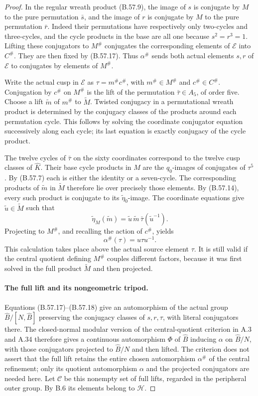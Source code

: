 \begin{proof}
In the regular wreath product (B.57.9), the image of
$s$ is conjugate by $M$ to the pure permutation
$\bar s$, and the image of $r$ is conjugate by $M$
to the pure permutation $\bar r$. Indeed their
permutations have respectively only two-cycles and
three-cycles, and the cycle products in the base
are all one because $s^2=r^3=1$. Lifting these
conjugators to $M^\#$ conjugates the corresponding
elements of $\mathscr E$ into $C^\#$. They are
then fixed by (B.57.17). Thus $\alpha^\#$ sends
both actual elements $s,r$ of $\mathscr E$ to
conjugates by elements of $M^\#$.

Write the actual cusp in $\mathscr E$ as
$\tau=m^\#c^\#$, with $m^\#\in M^\#$ and
$c^\#\in C^\#$. Conjugation by $c^\#$ on $M^\#$
is the lift of the permutation $\bar\tau\in A_5$,
of order five. Choose a lift $\widetilde m$ of
$m^\#$ to $\widetilde M$. Twisted conjugacy in a
permutational wreath product is determined by the
conjugacy classes of the products around each
permutation cycle. This follows by solving the
coordinate conjugator equation successively along
each cycle; its last equation is exactly conjugacy
of the cycle product.

The twelve cycles of $\bar\tau$ on the sixty
coordinates correspond to the twelve cusp classes
of $\widehat K$. Their base cycle products in $M$
are the $q_0$-images of conjugates of $\tau^5$.
By (B.57.7) each is either the identity or a
seven-cycle. The corresponding products of
$\widetilde m$ in $\widetilde M$ therefore lie over
precisely those elements. By (B.57.14), every such
product is conjugate to its $\widetilde\eta_0$-image.
The coordinate equations give
$\widetilde u\in\widetilde M$ such that
\[
 \widetilde\eta_M(\widetilde m)
       =\widetilde u\,\widetilde m\,
                              \bar\tau(\widetilde u^{-1}).
\]
Projecting to $M^\#$, and recalling the action of
$c^\#$, yields
\[
                         \alpha^\#(\tau)=u\tau u^{-1}.
                                                               \tag{B.57.18}
\]
This calculation takes place above the actual source
element $\tau$. It is still valid if the central
quotient defining $M^\#$ couples different factors,
because it was first solved in the full product
$\widetilde M$ and then projected.

\paragraph{The full lift and its nongeometric tripod.}
Equations (B.57.17)--(B.57.18) give an automorphism
of the actual group $\widehat B/[N,\widehat B]$
preserving the conjugacy classes of $s,r,\tau$,
with literal conjugators there. The closed-normal
modular version of the central-quotient criterion
in A.3 and A.34 therefore gives a continuous
automorphism $\Phi$ of $\widehat B$ inducing
$\alpha$ on $\widehat B/N$, with those conjugators
projected to $\widehat B/N$ and then lifted.
The criterion does not assert that the full lift
retains the entire chosen automorphism $\alpha^\#$
of the central refinement; only its quotient
automorphism $\alpha$ and the projected conjugators
are needed here.
Let $\mathscr C$ be this nonempty set of
full lifts, regarded in the peripheral outer group.
By B.6 its elements belong to $\mathcal H$.


\end{proof}
